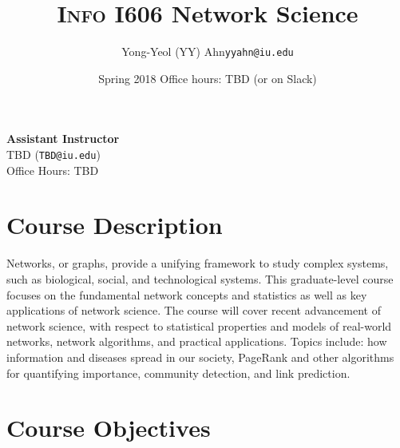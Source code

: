 \documentclass[11pt,article,oneside]{memoir} %
\makeatletter
\def\myauthor{Author}
\def\mytitle{Title}
\def\myemail{yyahn@iu.edu}
\def\myauthor{Yong-Yeol (YY) Ahn}
\def\mytitle{{\normalsize \textsc{Info} I606 \newline} \HUGE Network Science}
\makeatother
\begin{document}


\def\ind{\hangindent=1 true cm\hangafter=1 \noindent}
\def\labelitemi{$\cdot$}


\title{\LARGE \mytitle}     
\author{\Large\myauthor \newline \footnotesize\texttt{\noindent\myemail}}
\date{Spring 2018 %
\newline Office hours: TBD (or on Slack)}

\maketitle
\vspace{-20pt}
{\bfseries Assistant Instructor} \\ TBD (\texttt{TBD@iu.edu}) \\ Office Hours: TBD

\section{Course Description} %

Networks, or graphs, provide a unifying framework to study complex systems,
such as biological, social, and technological systems. This graduate-level
course focuses on the fundamental network concepts and statistics as well as
key applications of network science. The course will cover recent advancement
of network science, with respect to statistical properties and models of
real-world networks, network algorithms, and practical applications. Topics
include: how information and diseases spread in our society, PageRank and other
algorithms for quantifying importance, community detection, and link
prediction. 


\section{Course Objectives} %
\end{document}
